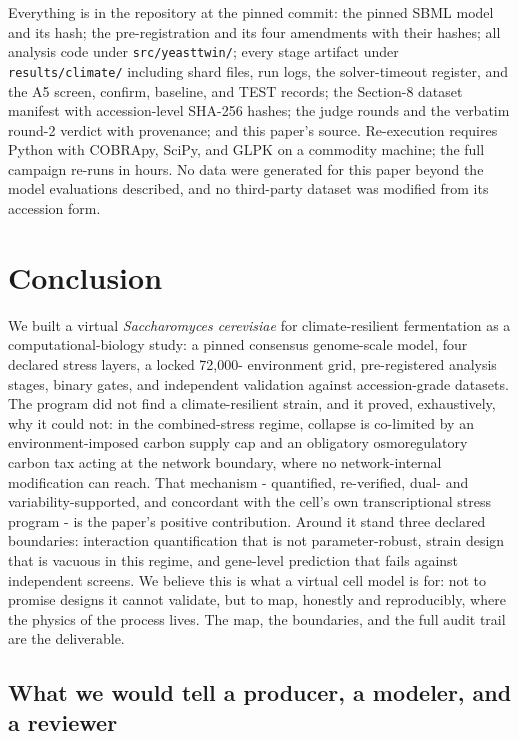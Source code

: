 \documentclass[12pt]{article}
\begin{document}
Everything is in the repository at the pinned commit: the pinned
SBML model and its hash; the pre-registration and its four amendments
with their hashes; all analysis code under \texttt{src/yeasttwin/};
every stage artifact under \texttt{results/climate/} including shard
files, run logs, the solver-timeout register, and the A5 screen,
confirm, baseline, and TEST records; the Section-8 dataset manifest
with accession-level SHA-256 hashes; the judge rounds and the
verbatim round-2 verdict with provenance; and this paper's source.
Re-execution requires Python with COBRApy, SciPy, and GLPK on a
commodity machine; the full campaign re-runs in hours. No data were
generated for this paper beyond the model evaluations described, and
no third-party dataset was modified from its accession form.

\section{Conclusion}
\label{sec:conclusion}

We built a virtual \emph{Saccharomyces cerevisiae} for climate-resilient
fermentation as a computational-biology study: a pinned consensus
genome-scale model, four declared stress layers, a locked 72{,}000-
environment grid, pre-registered analysis stages, binary gates, and
independent validation against accession-grade datasets. The program
did not find a climate-resilient strain, and it proved, exhaustively,
why it could not: in the combined-stress regime, collapse is co-limited
by an environment-imposed carbon supply cap and an obligatory
osmoregulatory carbon tax acting at the network boundary, where no
network-internal modification can reach. That mechanism - quantified,
re-verified, dual- and variability-supported, and concordant with the
cell's own transcriptional stress program - is the paper's positive
contribution. Around it stand three declared boundaries: interaction
quantification that is not parameter-robust, strain design that is
vacuous in this regime, and gene-level prediction that fails against
independent screens. We believe this is what a virtual cell model is
for: not to promise designs it cannot validate, but to map, honestly
and reproducibly, where the physics of the process lives. The map,
the boundaries, and the full audit trail are the deliverable.


\subsection{What we would tell a producer, a modeler, and a reviewer}
\end{document}
